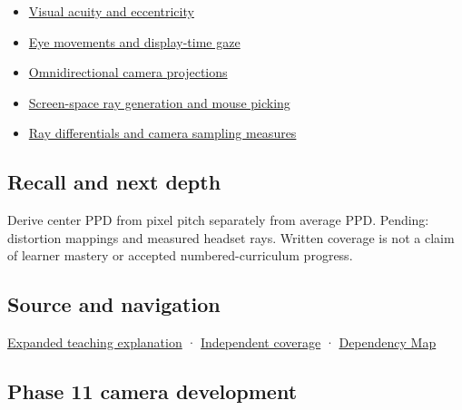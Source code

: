 \begin{itemize}
\item
  \hyperref[appendix-b491fc48c54b]{Visual acuity and eccentricity}
\item
  \hyperref[appendix-a6f2c4fe1996]{Eye movements and display-time gaze}
\item
  \hyperref[appendix-fc99ad39f351]{Omnidirectional camera projections}
\item
  \hyperref[appendix-f1a6d43e80d1]{Screen-space ray generation and mouse picking}
\item
  \hyperref[appendix-8c40fad29462]{Ray differentials and camera sampling measures}
\end{itemize}

\subsection{Recall and next depth}\label{appendix-7d356c396d1a-recall-and-next-depth}

\hypertarget{appendix-7d356c396d1a-recall-and-next-depth}{}

Derive center PPD from pixel pitch separately from average PPD. Pending: distortion mappings and measured headset rays. Written coverage is not a claim of learner mastery or accepted numbered-curriculum progress.

\subsection{Source and navigation}\label{appendix-7d356c396d1a-source-and-navigation}

\hypertarget{appendix-7d356c396d1a-source-and-navigation}{}

\hyperref[04-visual-computing-ii-ch042-angles-connect-display-samples-to-a-viewer]{Expanded teaching explanation} · \hyperref[appendix-fd090d982a15-xr01---independent-seeing-and-representation-source]{Independent coverage} · \hyperref[appendix-4ad47bdd269a]{Dependency Map}

\subsection{Phase 11 camera development}\label{appendix-7d356c396d1a-phase-11-camera-development}

\hypertarget{appendix-7d356c396d1a-phase-11-camera-development}{}

